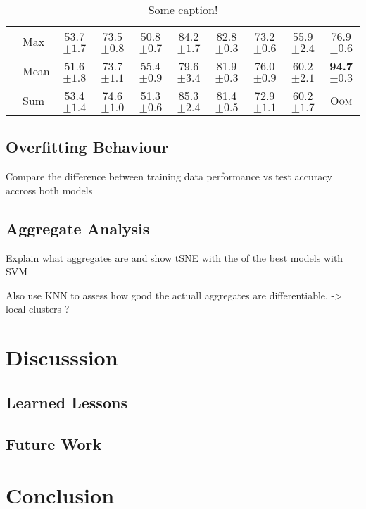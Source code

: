 \begin{table}
{\begin{tabular}{@{}c <{\enspace}@{}lcccccccc@{}}
			\cmidrule{2-10}	
						
			\multirow{3}{*}{\rotatebox{90}{GAT}} & \textsf{Max}                    & 53.7   \scriptsize	$\pm 1.7$        & 73.5     \scriptsize $\pm 0.8$          & 50.8 \scriptsize $\pm 0.7$            & 84.2  \scriptsize $\pm 1.7$          & 82.8  \scriptsize $\pm 0.3$         & 73.2  \scriptsize $\pm 0.6$          & 55.9  \scriptsize $\pm 2.4$         & 76.9  \scriptsize $\pm 0.6$         
			\\ 
			                                                         & \textsf{Mean}         & 51.6 \scriptsize	$\pm 1.8$          & 73.7    \scriptsize $\pm 1.1$           & 55.4 \scriptsize $\pm 0.9$            & 79.6   \scriptsize $\pm 3.4$         & 81.9 \scriptsize $\pm 0.3 $         & 76.0  \scriptsize $\pm 0.9$          & 60.2 \scriptsize $\pm 2.1 $         & \textbf{94.7} \scriptsize $\pm 0.3$ 
			\\ 
			                                                         & \textsf{Sum}                   & 53.4 \scriptsize	$\pm 1.4$          & 74.6   \scriptsize $\pm 1.0$            & 51.3 \scriptsize $\pm 0.6$            & 85.3  \scriptsize $\pm 2.4$          & 81.4 \scriptsize $\pm 0.5$          & 72.9  \scriptsize$\pm 1.1$           & 60.2  \scriptsize $\pm 1.7$         & \textsc{Oom}                        
			\\
			
			\bottomrule
		\end{tabular}}
        \caption{Some caption!}
        \label{tab:my_label}                  
\end{table}    
   

\subsection{Overfitting Behaviour}
Compare the difference between training data performance vs test accuracy accross both models

\subsection{Aggregate Analysis}
Explain what aggregates are and show tSNE with the of the best models with SVM

Also use KNN to assess how good the actuall aggregates are differentiable. -> local clusters ?

\section{Discusssion}
\subsection{Learned Lessons}
\subsection{Future Work}

\section{Conclusion}